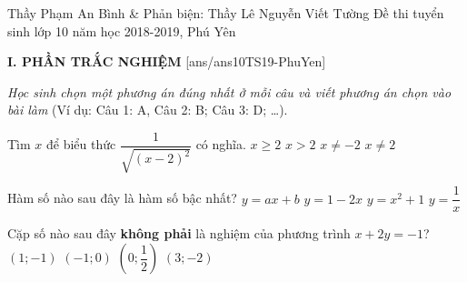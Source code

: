 \begin{name}
{Thầy Phạm An Bình \& Phản biện: Thầy Lê Nguyễn Viết Tường}
{Đề thi tuyển sinh lớp 10 năm học 2018-2019, Phú Yên}
\end{name}
\noindent\textbf{I. PHẦN TRẮC NGHIỆM}
\setcounter{ex}{0}
[ans/ans10TS19-PhuYen]

\textit{Học sinh chọn một phương án đúng nhất ở mỗi câu và viết phương án chọn vào bài làm} (Ví dụ: Câu 1: A, Câu 2: B; Câu 3: D; \ldots).
\begin{ex}%
	Tìm $x$ để biểu thức $\dfrac{1}{\sqrt{(x-2)^2}}$ có nghĩa.
	\choice
	{$x\ge 2$}
	{$x>2$}
	{$x\ne -2$}
	{\True $x\ne 2$}
\end{ex}

\begin{ex}%
	Hàm số nào sau đây là hàm số bậc nhất?
	\choice
	{$y=ax+b$}
	{\True $y=1-2x$}
	{$y=x^2+1$}
	{$y=\dfrac{1}{x}$}
\end{ex}


\begin{ex}%
	Cặp số nào sau đây \textbf{không phải} là nghiệm của phương trình $x+2y=-1$?
	\choice
	{$(1;-1)$}
	{$(-1;0)$}
	{\True $\left(0;\dfrac{1}{2}\right)$}
	{$(3;-2)$}
\end{ex}

